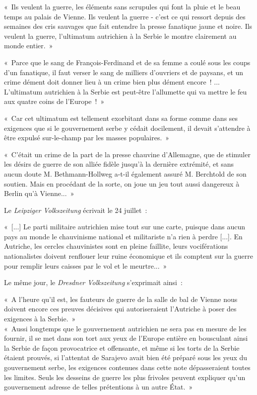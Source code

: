 \documentclass[french,twoside]{book} %
\newenvironment{quoteblock}%
  {\begin{quoting}}
  {\end{quoting}}
\newenvironment{quotebar}{%
    \def\FrameCommand{{\color{rubric!10!}\vrule width 0.5em} \hspace{0.9em}}%
    \def\OuterFrameSep{\itemsep} %
    \MakeFramed {\advance\hsize-\width \FrameRestore}
  }%
  {%
    \endMakeFramed
  }
\renewenvironment{quoteblock}%
  {%
    \savenotes
    \setstretch{0.9}
    \normalfont
    \begin{quotebar}
  }
  {%
    \end{quotebar}
    \spewnotes
  }
\begin{document}
\begin{quoteblock}
 \noindent « Ils veulent la guerre, les éléments sans scrupules qui font la pluie et le beau temps au palais de Vienne. Ils veulent la guerre - c’est ce qui ressort depuis des semaines des cris sauvages que fait entendre la presse fanatique jaune et noire. Ils veulent la guerre, l’ultimatum autrichien à la Serbie le montre clairement au monde entier. »\par
 « Parce que le sang de François-Ferdinand et de sa femme a coulé sous les coups d’un fanatique, il faut verser le sang de milliers d’ouvriers et de paysans, et un crime dément doit donner lieu à un crime bien plus dément encore ! ... L'ultimatum autrichien à la Serbie est peut-être l’allumette qui va mettre le feu aux quatre coins de l’Europe ! »\par
 « Car cet ultimatum est tellement exorbitant dans sa forme comme dans ses exigences que si le gouvernement serbe y cédait docilement, il devait s’attendre à être expulsé sur-le-champ par les masses populaires. »\par
 « C'était un crime de la part de la presse chauvine d’Allemagne, que de stimuler les désirs de guerre de son alliée fidèle jusqu’à la dernière extrémité, et sans aucun doute M. Bethmann-Hollweg a-t-il également assuré M. Berchtold de son soutien. Mais en procédant de la sorte, on joue un jeu tout aussi dangereux à Berlin qu’à Vienne... »
\end{quoteblock}

\noindent Le \emph{Leipziger Volkszeitung} écrivait le 24 juillet :\par

\begin{quoteblock}
 \noindent « [...] Le parti militaire autrichien mise tout sur une carte, puisque dans aucun pays au monde le chauvinisme national et militariste n’a rien à perdre [...]. En Autriche, les cercles chauvinistes sont en pleine faillite, leurs vociférations nationalistes doivent renflouer leur ruine économique et ils comptent sur la guerre pour remplir leurs caisses par le vol et le meurtre... »
\end{quoteblock}

\noindent Le même jour, le \emph{Dresdner Volkszeitung} s’exprimait ainsi :\par

\begin{quoteblock}
 \noindent « A l’heure qu’il est, les fauteurs de guerre de la salle de bal de Vienne nous doivent encore ces preuves décisives qui autoriseraient l’Autriche à poser des exigences à la Serbie. » \\
« Aussi longtemps que le gouvernement autrichien ne sera pas en mesure de les fournir, il se met dans son tort aux yeux de l’Europe entière en bousculant ainsi la Serbie de façon provocatrice et offensante, et même si les torts de la Serbie étaient prouvés, si l’attentat de Sarajevo avait bien été préparé sous les yeux du gouvernement serbe, les exigences contenues dans cette note dépasseraient toutes les limites. Seuls les desseins de guerre les plus frivoles peuvent expliquer qu’un gouvernement adresse de telles prétentions à un autre État. »
\end{quoteblock}
\end{document}
